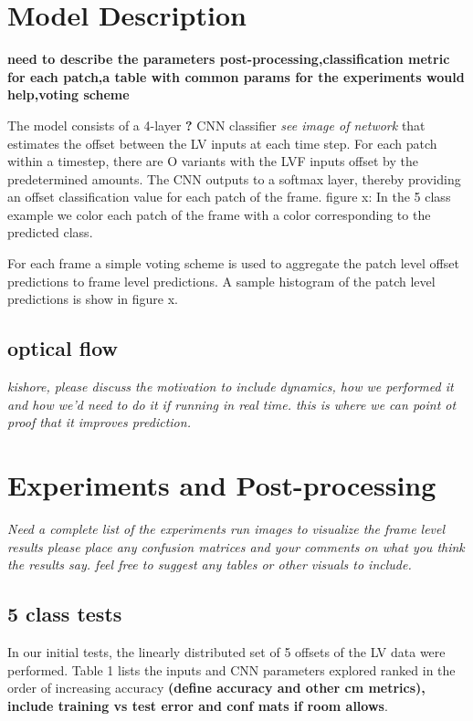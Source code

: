 \documentclass{article}
\begin{document}


\section{Model Description}
\textbf{need to describe the parameters post-processing,classification metric for each patch,a table with common params for the experiments would help,voting scheme}

The model consists of a 4-layer \textbf{?} CNN classifier \textit{see image of network} that estimates the offset between the LV inputs at each time step. For each patch within a timestep, there are O variants with the LVF inputs offset by the predetermined amounts. The CNN outputs to a softmax layer, thereby providing an offset classification value for each patch of the frame. 
figure x: In the 5 class example we color each patch of the frame with a color corresponding to the predicted class. 

For each frame a simple voting scheme is used to aggregate the patch level offset predictions to frame level predictions. A sample histogram of the patch level predictions is show in figure x.

\subsection{optical flow} \textit{kishore, please discuss the motivation to include dynamics, how we performed it and how we'd need to do it if running in real time. this is where we can point ot proof that it improves prediction.}

\section{Experiments and Post-processing} %
\label{sec:experiments_and_post_processing}
\textit{Need a complete list of the experiments run
images to visualize the frame level results
please place any confusion matrices and your comments on what you think the results say.
feel free to suggest any tables or other visuals to include.}

\subsection{5 class tests}
In our initial tests, the linearly distributed set of 5 offsets of the LV data were performed. Table 1 lists the inputs and CNN parameters explored ranked in the order of increasing accuracy \textbf{(define accuracy and other cm metrics), include training vs test error and conf mats if room allows}.  
\end{document}

